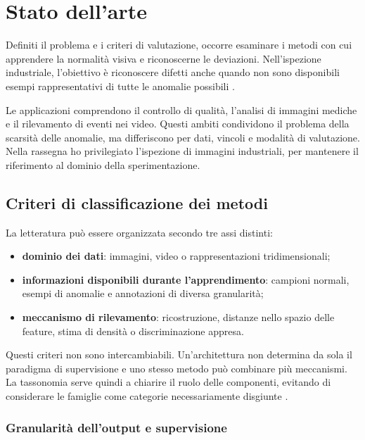 \chapter{Stato dell'arte}
\label{chap:stato-arte}

Definiti il problema e i criteri di valutazione, occorre esaminare i metodi con cui apprendere la normalità visiva e riconoscerne le deviazioni. Nell'ispezione industriale, l'obiettivo è riconoscere difetti anche quando non sono disponibili esempi rappresentativi di tutte le anomalie possibili \cite{Yang_et_al._2021,Cui_et_al._2023}.

Le applicazioni comprendono il controllo di qualità, l'analisi di immagini mediche e il rilevamento di eventi nei video. Questi ambiti condividono il problema della scarsità delle anomalie, ma differiscono per dati, vincoli e modalità di valutazione. Nella rassegna ho privilegiato l'ispezione di immagini industriali, per mantenere il riferimento al dominio della sperimentazione.

\section{Criteri di classificazione dei metodi}

La letteratura può essere organizzata secondo tre assi distinti:
\begin{itemize}
    \item \textbf{dominio dei dati}: immagini, video o rappresentazioni tridimensionali;
    \item \textbf{informazioni disponibili durante l'apprendimento}: campioni normali, esempi di anomalie e annotazioni di diversa granularità;
    \item \textbf{meccanismo di rilevamento}: ricostruzione, distanze nello spazio delle feature, stima di densità o discriminazione appresa.
\end{itemize}

Questi criteri non sono intercambiabili. Un'architettura non determina da sola il paradigma di supervisione e uno stesso metodo può combinare più meccanismi. La tassonomia serve quindi a chiarire il ruolo delle componenti, evitando di considerare le famiglie come categorie necessariamente disgiunte \cite{Cui_et_al._2023}.

\subsection{Granularità dell'output e supervisione}


